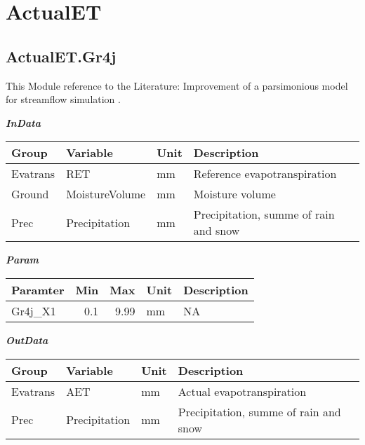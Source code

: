 \documentclass[
]{book}
\begin{document}
\hypertarget{actualet}{%
\section{ActualET}\label{actualet}}

\hypertarget{actualet.gr4j}{%
\subsection{ActualET.Gr4j}\label{actualet.gr4j}}

This Module reference to the Literature: Improvement of a parsimonious model for streamflow simulation \citep{Perrin.2003}.

\textbf{\emph{InData}}

\begin{table}[!h]
\centering
\begin{tabular}{l|l|l|l}
\hline
Group & Variable & Unit & Description\\
\hline
Evatrans & RET & mm & Reference evapotranspiration\\
\cline{1-4}
Ground & MoistureVolume & mm & Moisture volume\\
\cline{1-4}
Prec & Precipitation & mm & Precipitation, summe of rain and snow\\
\hline
\end{tabular}
\end{table}

\textbf{\emph{Param}}

\begin{table}[!h]
\centering
\begin{tabular}{l|r|r|l|l}
\hline
Paramter & Min & Max & Unit & Description\\
\hline
Gr4j\_X1 & 0.1 & 9.99 & mm & NA\\
\hline
\end{tabular}
\end{table}

\textbf{\emph{OutData}}

\begin{table}[!h]
\centering
\begin{tabular}{l|l|l|l}
\hline
Group & Variable & Unit & Description\\
\hline
Evatrans & AET & mm & Actual evapotranspiration\\
\cline{1-4}
Prec & Precipitation & mm & Precipitation, summe of rain and snow\\
\hline
\end{tabular}
\end{table}
\end{document}

